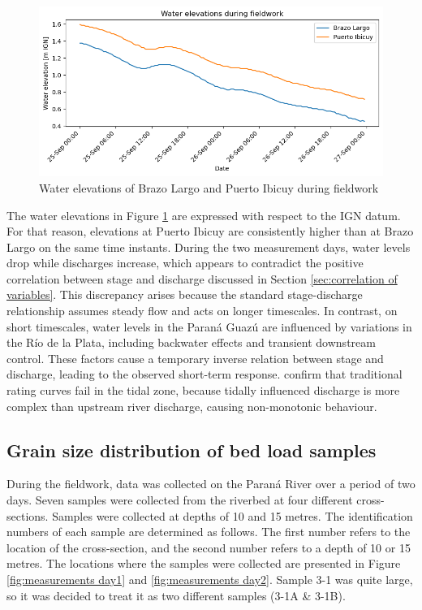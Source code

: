 \begin{figure}
    \centering
    \includegraphics[width=0.75\linewidth]{figures/ch6/water elevations fieldwork.png}
    \caption{Water elevations of Brazo Largo and Puerto Ibicuy during fieldwork}
    \label{fig:water elevations fieldwork}
\end{figure}

The water elevations in Figure \ref{fig:water elevations fieldwork} are expressed with respect to the IGN datum. For that reason, elevations at Puerto Ibicuy are consistently higher than at Brazo Largo on the same time instants. During the two measurement days, water levels drop while discharges increase, which appears to contradict the positive correlation between stage and discharge discussed in Section \ref{sec:correlation of variables}. This discrepancy arises because the standard stage-discharge relationship assumes steady flow and acts on longer timescales. In contrast, on short timescales, water levels in the Paraná Guazú are influenced by variations in the Río de la Plata, including backwater effects and transient downstream control. These factors cause a temporary inverse relation between stage and discharge, leading to the observed short-term response. \citeauthor{jonesExpandedRatingCurve2019} confirm that traditional rating curves fail in the tidal zone, because tidally influenced discharge is more complex than upstream river discharge, causing non-monotonic behaviour. 




\subsection{Grain size distribution of bed load samples}
\label{sec:grainsizedistribution}
During the fieldwork, data was collected on the Paraná River over a period of two days. Seven samples were collected from the riverbed at four different cross-sections. Samples were collected at depths of 10 and 15 metres. The identification numbers of each sample are determined as follows. The first number refers to the location of the cross-section, and the second number refers to a depth of 10 or 15 metres. The locations where the samples were collected are presented in Figure \ref{fig:measurements day1} and \ref{fig:measurements day2}. Sample 3-1 was quite large, so it was decided to treat it as two different samples (3-1A \& 3-1B). 

